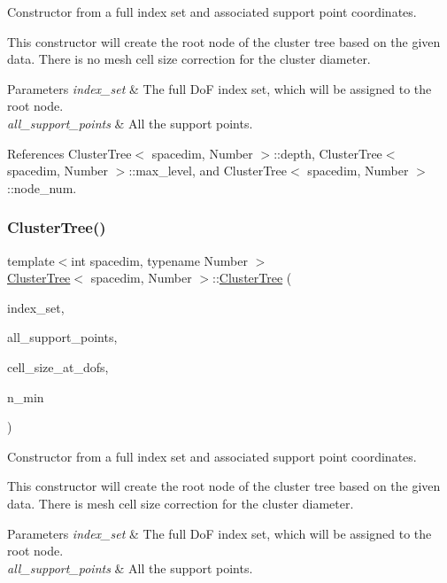 Constructor from a full index set and associated support point coordinates.

This constructor will create the root node of the cluster tree based on the given data. There is no mesh cell size correction for the cluster diameter. 
\begin{DoxyParams}{Parameters}
{\em index\+\_\+set} & The full DoF index set, which will be assigned to the root node. \\
\hline
{\em all\+\_\+support\+\_\+points} & All the support points. \\
\hline
\end{DoxyParams}


References Cluster\+Tree$<$ spacedim, Number $>$\+::depth, Cluster\+Tree$<$ spacedim, Number $>$\+::max\+\_\+level, and Cluster\+Tree$<$ spacedim, Number $>$\+::node\+\_\+num.

\mbox{\label{classClusterTree_a3fd518db632c62cfafb61e9ef56097c7}} 
\subsubsection{\texorpdfstring{Cluster\+Tree()}{ClusterTree()}\hspace{0.1cm}{\footnotesize\ttfamily [4/5]}}
{\footnotesize\ttfamily template$<$int spacedim, typename Number $>$ \\
\hyperlink{classClusterTree}{Cluster\+Tree}$<$ spacedim, Number $>$\+::\hyperlink{classClusterTree}{Cluster\+Tree} (\begin{DoxyParamCaption}\item[{const std\+::vector$<$ types\+::global\+\_\+dof\+\_\+index $>$ \&}]{index\+\_\+set,  }\item[{const std\+::vector$<$ Point$<$ spacedim $>$$>$ \&}]{all\+\_\+support\+\_\+points,  }\item[{const std\+::vector$<$ Number $>$ \&}]{cell\+\_\+size\+\_\+at\+\_\+dofs,  }\item[{const unsigned int}]{n\+\_\+min }\end{DoxyParamCaption})}

Constructor from a full index set and associated support point coordinates.

This constructor will create the root node of the cluster tree based on the given data. There is mesh cell size correction for the cluster diameter. 
\begin{DoxyParams}{Parameters}
{\em index\+\_\+set} & The full DoF index set, which will be assigned to the root node. \\
\hline
{\em all\+\_\+support\+\_\+points} & All the support points. \\
\hline
\end{DoxyParams}


